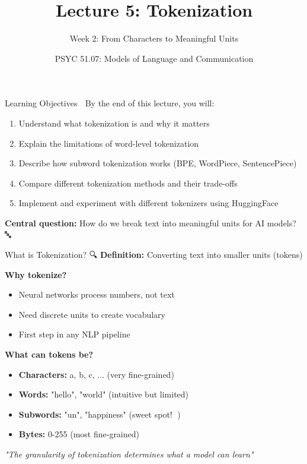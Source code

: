 \documentclass[aspectratio=169]{beamer}
\title{Lecture 5: Tokenization}
\subtitle{Week 2: From Characters to Meaningful Units}
\author{PSYC 51.07: Models of Language and Communication}
\date{}
\begin{document}
\begin{frame}
    \titlepage
\end{frame}

\begin{frame}{Learning Objectives 🎯}
    By the end of this lecture, you will:

    \begin{enumerate}\setlength{\itemsep}{0pt}
        \item Understand what tokenization is and why it matters
        \item Explain the limitations of word-level tokenization
        \item Describe how subword tokenization works (BPE, WordPiece, SentencePiece)
        \item Compare different tokenization methods and their trade-offs
        \item Implement and experiment with different tokenizers using HuggingFace
    \end{enumerate}

    \vspace{1em}
    \textbf{Central question:} How do we break text into meaningful units for AI models? 🔤
\end{frame}

\begin{frame}[shrink=10]{What is Tokenization? 🔍}
    \textbf{Definition:} Converting text into smaller units (tokens)

    \vspace{0.5em}
    \textbf{Why tokenize?}
    \begin{itemize}\setlength{\itemsep}{0pt}
        \item Neural networks process numbers, not text
        \item Need discrete units to create vocabulary
        \item First step in any NLP pipeline
    \end{itemize}

    \vspace{0.5em}
    \textbf{What can tokens be?}
    \begin{itemize}\setlength{\itemsep}{0pt}
        \item \textbf{Characters:} a, b, c, ... (very fine-grained)
        \item \textbf{Words:} "hello", "world" (intuitive but limited)
        \item \textbf{Subwords:} "un", "happiness" (sweet spot! 🎯)
        \item \textbf{Bytes:} 0-255 (most fine-grained)
    \end{itemize}

    \vspace{0.5em}
    \begin{center}
        \textit{"The granularity of tokenization determines what a model can learn"}
    \end{center}
\end{frame}
\end{document}
